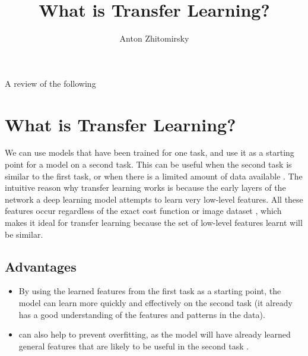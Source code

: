 \documentclass[11pt]{article}
\title{What is Transfer Learning?}
\author{Anton Zhitomirsky}
\begin{document}
\maketitle

A review of the following \cite{gentle-introdcution-to-trasnfer-learning, deep-learning-book, concise-review-of-transfer-learning,comprehensive-survey-on-transfer-learning,what-is-being-transferred,liver-lesion-via-transfer-learning,transfer-learning-tutorial,transfer-learning-medium,transfer-learning-for-medical-image-classification-review,transfer-learning-in-medical-imaging,transfusion-medical-imaging,supervised-transfer-learning-at-scale,3d-medical-metric-analysis-2015, survey-on-transfer-learning, computer-vision-book}

\section{What is Transfer Learning?}

We can use models that have been trained for one task, and use it as a starting point for a model on a second task. This can be useful when the second task is similar to the first task, or when there is a limited amount of data available \cite{geeks-transfer-learning}. The intuitive reason why transfer learning works is because the early layers of the network a deep learning model attempts to learn very low-level features. All these features occur regardless of the exact cost function or image dataset \cite{geeks-transfer-learning}, which makes it ideal for transfer learning because the set of low-level features learnt will be similar.

\subsection{Advantages}

\begin{itemize}
    \item By using the learned features from the first task as a starting point, the model can learn more quickly and effectively on the second task \cite{geeks-transfer-learning} (it already has a good understanding of the features and patterns in the data).
    \item can also help to prevent overfitting, as the model will have already learned general features that are likely to be useful in the second task \cite{geeks-transfer-learning}.
\end{itemize}
\end{document}

